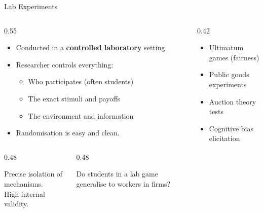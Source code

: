 \documentclass[aspectratio=169, 11pt]{beamer}
\begin{document}
\begin{frame}[t]{Lab Experiments}
\begin{columns}[T]
\begin{column}{0.55\textwidth}
\begin{itemize}
  \setlength\itemsep{0.4em}
  \item Conducted in a \textbf{controlled laboratory} setting.
  \item Researcher controls everything:
    \begin{itemize}
      \item Who participates (often students)
      \item The exact stimuli and payoffs
      \item The environment and information
    \end{itemize}
  \item Randomisation is easy and clean.
\end{itemize}
\vspace{0.4em}
\begin{columns}[T]
\begin{column}{0.48\textwidth}
  \begin{keybox}[Strength]
    Precise isolation of mechanisms.\\
    High internal validity.
  \end{keybox}
\end{column}
\begin{column}{0.48\textwidth}
  \begin{warningbox}[Weakness]
    Do students in a lab game generalise to workers in firms?
  \end{warningbox}
\end{column}
\end{columns}
\end{column}
\begin{column}{0.42\textwidth}
  \vspace{0.5em}
  \begin{examplebox}
    \small
    \begin{itemize}
      \item Ultimatum games (fairness)
      \item Public goods experiments
      \item Auction theory tests
      \item Cognitive bias elicitation
    \end{itemize}
  \end{examplebox}
\end{column}
\end{columns}
\end{frame}
\end{document}
